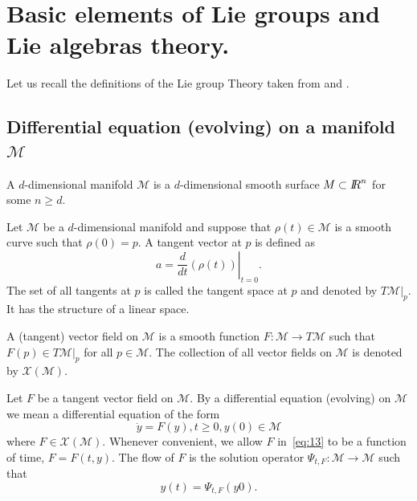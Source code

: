 \section{Basic elements of  Lie groups and Lie algebras theory.}
Let us recall the definitions of the  Lie group Theory taken from \cite{Iserles.ea_AN2000} and \cite{Varadarajan_book1984}.




\subsection{Differential equation (evolving) on a manifold $\mathcal M$}
\begin{definition}
 A $d$-dimensional manifold $\mathcal M$ is a $d$-dimensional smooth surface $ M\subset \mbox{\rm $I\!\!R$}^n$ for some $n\geq d$.
\end{definition}
\begin{definition}
  Let $\mathcal M$ be a $d$-dimensional manifold and suppose that $\rho(t) \in\mathcal M$  is a smooth curve such that $\rho(0) = p$. A tangent vector at $p$ is defined as
  \begin{equation}
    \label{eq:12}
    a = \left. \frac{d}{dt} (\rho(t)) \right|_{t=0}.
  \end{equation}
The set of all tangents at $p$ is called the tangent space at $p$ and denoted by $T\mathcal M|_p$. It has the structure of a linear space.
\end{definition}
\begin{definition}
   A (tangent) vector field on $\mathcal M$ is a smooth function $F : \mathcal M \rightarrow T\mathcal M$ such that $F (p) \in T\mathcal M|_p$ for all $p \in \mathcal M$. The collection of all vector fields on $\mathcal M$ is denoted by $\mathcal X(\mathcal M)$.
 \end{definition}


 \begin{definition}
   Let $F$ be a tangent vector field on $\mathcal M$. By a differential equation (evolving) on $\mathcal M$ we mean a differential equation of the form
   \begin{equation}
     \dot y =F(y), t\geq  0, y(0)\in \mathcal M\label{eq:13}
   \end{equation}
   where $F \in \mathcal X(\mathcal M)$. Whenever convenient, we allow $F$ in~\eqref{eq:13} to be a function of time, $F = F(t,y)$. The flow of $F$ is the solution operator $\Psi_{t,F} : \mathcal M \rightarrow  \mathcal M$ such that
   \begin{equation}
     y(t) = \Psi_{t,F} (y0).\label{eq:14}
   \end{equation}
 \end{definition}

